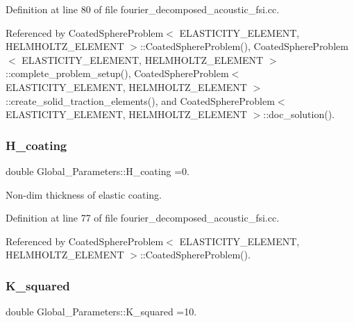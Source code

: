 Definition at line 80 of file fourier\+\_\+decomposed\+\_\+acoustic\+\_\+fsi.\+cc.



Referenced by Coated\+Sphere\+Problem$<$ E\+L\+A\+S\+T\+I\+C\+I\+T\+Y\+\_\+\+E\+L\+E\+M\+E\+N\+T, H\+E\+L\+M\+H\+O\+L\+T\+Z\+\_\+\+E\+L\+E\+M\+E\+N\+T $>$\+::\+Coated\+Sphere\+Problem(), Coated\+Sphere\+Problem$<$ E\+L\+A\+S\+T\+I\+C\+I\+T\+Y\+\_\+\+E\+L\+E\+M\+E\+N\+T, H\+E\+L\+M\+H\+O\+L\+T\+Z\+\_\+\+E\+L\+E\+M\+E\+N\+T $>$\+::complete\+\_\+problem\+\_\+setup(), Coated\+Sphere\+Problem$<$ E\+L\+A\+S\+T\+I\+C\+I\+T\+Y\+\_\+\+E\+L\+E\+M\+E\+N\+T, H\+E\+L\+M\+H\+O\+L\+T\+Z\+\_\+\+E\+L\+E\+M\+E\+N\+T $>$\+::create\+\_\+solid\+\_\+traction\+\_\+elements(), and Coated\+Sphere\+Problem$<$ E\+L\+A\+S\+T\+I\+C\+I\+T\+Y\+\_\+\+E\+L\+E\+M\+E\+N\+T, H\+E\+L\+M\+H\+O\+L\+T\+Z\+\_\+\+E\+L\+E\+M\+E\+N\+T $>$\+::doc\+\_\+solution().

\mbox{\label{namespaceGlobal__Parameters_ae3cf8878ede839bffda01f79bbe3e819}} 
\subsubsection{\texorpdfstring{H\+\_\+coating}{H\_coating}}
{\footnotesize\ttfamily double Global\+\_\+\+Parameters\+::\+H\+\_\+coating =0.}



Non-\/dim thickness of elastic coating. 



Definition at line 77 of file fourier\+\_\+decomposed\+\_\+acoustic\+\_\+fsi.\+cc.



Referenced by Coated\+Sphere\+Problem$<$ E\+L\+A\+S\+T\+I\+C\+I\+T\+Y\+\_\+\+E\+L\+E\+M\+E\+N\+T, H\+E\+L\+M\+H\+O\+L\+T\+Z\+\_\+\+E\+L\+E\+M\+E\+N\+T $>$\+::\+Coated\+Sphere\+Problem().

\mbox{\label{namespaceGlobal__Parameters_a91a3fa265abaf9e724c668ee800ffb29}} 
\subsubsection{\texorpdfstring{K\+\_\+squared}{K\_squared}}
{\footnotesize\ttfamily double Global\+\_\+\+Parameters\+::\+K\+\_\+squared =10.}



